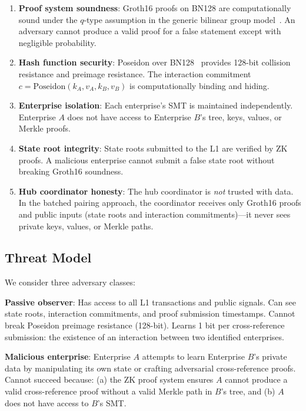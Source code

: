 \begin{enumerate}
\item \textbf{Proof system soundness}: Groth16 proofs on BN128 are
  computationally sound under the $q$-type assumption in the generic bilinear
  group model~\cite{groth2016size}. An adversary cannot produce a valid proof
  for a false statement except with negligible probability.

\item \textbf{Hash function security}: Poseidon over BN128~\cite{grassi2021poseidon}
  provides 128-bit collision resistance and preimage resistance. The
  interaction commitment $c = \text{Poseidon}(k_A, v_A, k_B, v_B)$ is
  computationally binding and hiding.

\item \textbf{Enterprise isolation}: Each enterprise's SMT is maintained
  independently. Enterprise $A$ does not have access to Enterprise $B$'s tree,
  keys, values, or Merkle proofs.

\item \textbf{State root integrity}: State roots submitted to the L1 are
  verified by ZK proofs. A malicious enterprise cannot submit a false state
  root without breaking Groth16 soundness.

\item \textbf{Hub coordinator honesty}: The hub coordinator is \emph{not}
  trusted with data. In the batched pairing approach, the coordinator receives
  only Groth16 proofs and public inputs (state roots and interaction
  commitments)---it never sees private keys, values, or Merkle paths.
\end{enumerate}

\subsection{Threat Model}

We consider three adversary classes:

\textbf{Passive observer}: Has access to all L1 transactions and public
signals. Can see state roots, interaction commitments, and proof submission
timestamps. Cannot break Poseidon preimage resistance (128-bit). Learns 1 bit
per cross-reference submission: the existence of an interaction between two
identified enterprises.

\textbf{Malicious enterprise}: Enterprise $A$ attempts to learn Enterprise
$B$'s private data by manipulating its own state or crafting adversarial
cross-reference proofs. Cannot succeed because: (a) the ZK proof system
ensures $A$ cannot produce a valid cross-reference proof without a valid
Merkle path in $B$'s tree, and (b) $A$ does not have access to $B$'s SMT.

